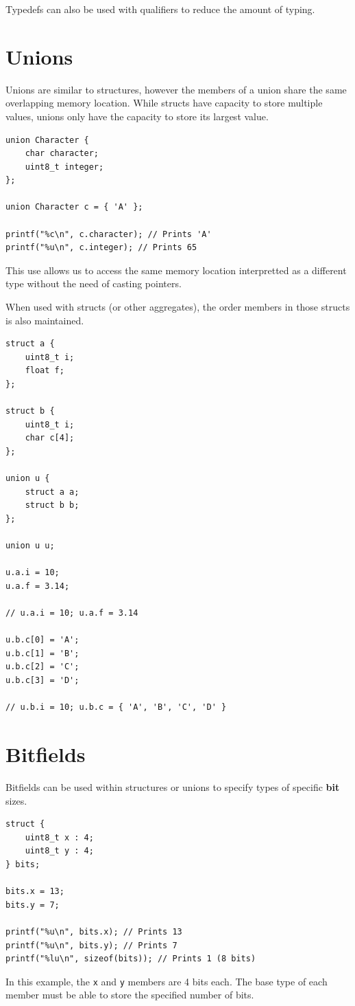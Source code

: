 \documentclass{report}
\begin{document}
Typedefs can also be used with qualifiers to reduce the amount of typing.
\section{Unions}
Unions are similar to structures, however the members of a union share the same overlapping memory location.
While structs have capacity to store multiple values, unions only have the capacity to store its largest value.
\begin{verbatim}
union Character {
    char character;
    uint8_t integer;
};

union Character c = { 'A' };

printf("%c\n", c.character); // Prints 'A'
printf("%u\n", c.integer); // Prints 65
\end{verbatim}
This use allows us to access the same memory location interpretted as
a different type without the need of casting pointers.

When used with structs (or other aggregates), the order members in those structs is
also maintained.
\begin{verbatim}
struct a {
    uint8_t i;
    float f;
};

struct b {
    uint8_t i;
    char c[4];
};

union u {
    struct a a;
    struct b b;
};

union u u;

u.a.i = 10;
u.a.f = 3.14;

// u.a.i = 10; u.a.f = 3.14

u.b.c[0] = 'A';
u.b.c[1] = 'B';
u.b.c[2] = 'C';
u.b.c[3] = 'D';

// u.b.i = 10; u.b.c = { 'A', 'B', 'C', 'D' }
\end{verbatim}
\section{Bitfields}
Bitfields can be used within structures or unions to specify types
of specific \textbf{bit} sizes.
\begin{verbatim}
struct {
    uint8_t x : 4;
    uint8_t y : 4;
} bits;

bits.x = 13;
bits.y = 7;

printf("%u\n", bits.x); // Prints 13
printf("%u\n", bits.y); // Prints 7
printf("%lu\n", sizeof(bits)); // Prints 1 (8 bits)
\end{verbatim}
In this example, the \texttt{x} and \texttt{y} members are 4 bits each.
The base type of each member must be able to store the specified number of bits.
\end{document}
